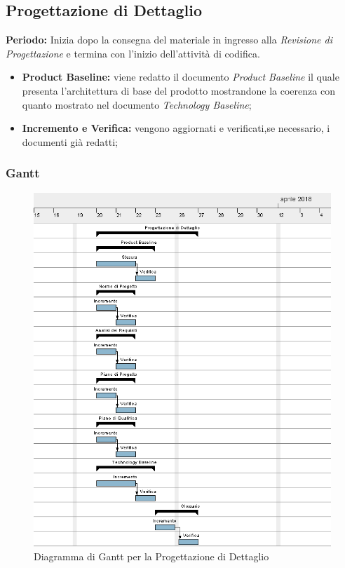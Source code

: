 \subsection{Progettazione di Dettaglio}
    \textbf{Periodo:}
    Inizia dopo la consegna del materiale in ingresso alla \emph{Revisione di Progettazione} e termina con l'inizio dell'attività di codifica.
    \begin{itemize}
    	\item \textbf{Product Baseline:} viene redatto il documento \emph{Product Baseline} il quale presenta l'architettura di base del prodotto mostrandone la coerenza con quanto mostrato nel documento \emph{Technology Baseline};
    	\item \textbf{Incremento e Verifica:} vengono aggiornati e verificati,se necessario, i documenti già redatti;
    \end{itemize}
\subsubsection{Gantt}
\begin{figure}[H]
	\centering 
	\includegraphics[width=1\textwidth]{images/Progettazione-Dettaglio.png}
	\caption{Diagramma di Gantt per la Progettazione di Dettaglio}
	\label{graficobello4} 
\end{figure}
